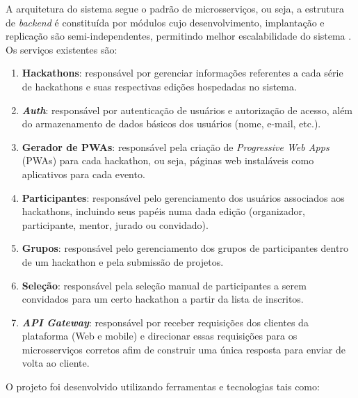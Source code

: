 \documentclass[10pt,twoside,a4paper]{article}
\begin{document}
    A arquitetura do sistema segue o padrão de microsserviços, ou seja, a estrutura de \textit{backend} é constituída por módulos cujo desenvolvimento, implantação e replicação são semi-independentes, permitindo melhor escalabilidade do sistema \cite{Newman2015BuildingSystems}. Os serviços existentes são:
    
    \begin{enumerate}
        \item \textbf{Hackathons}: responsável por gerenciar informações referentes a cada série de hackathons e suas respectivas edições hospedadas no sistema.
        
        \item \textbf{\textit{Auth}}: responsável por autenticação de usuários e autorização de acesso, além do armazenamento de dados básicos dos usuários (nome, e-mail, etc.).
        
        \item \textbf{Gerador de PWAs}: responsável pela criação de \textit{Progressive Web Apps} (PWAs) para cada hackathon, ou seja, páginas web instaláveis como aplicativos para cada evento.
        
         \item \textbf{Participantes}: responsável pelo gerenciamento dos usuários associados aos hackathons, incluindo seus papéis numa dada edição (organizador, participante, mentor, jurado ou convidado).
         
         \item \textbf{Grupos}: responsável pelo gerenciamento dos grupos de participantes dentro de um hackathon e pela submissão de projetos.
         
         \item \textbf{Seleção}: responsável pela seleção manual de participantes a serem convidados para um certo hackathon a partir da lista de inscritos.
         
         \item \textbf{\textit{API Gateway}}: responsável por receber requisições dos clientes da plataforma (Web e mobile) e direcionar essas requisições para os microsserviços corretos afim de construir uma única resposta para enviar de volta ao cliente.
    \end{enumerate}
    
    O projeto foi desenvolvido utilizando ferramentas e tecnologias tais como:
    
\end{document}
